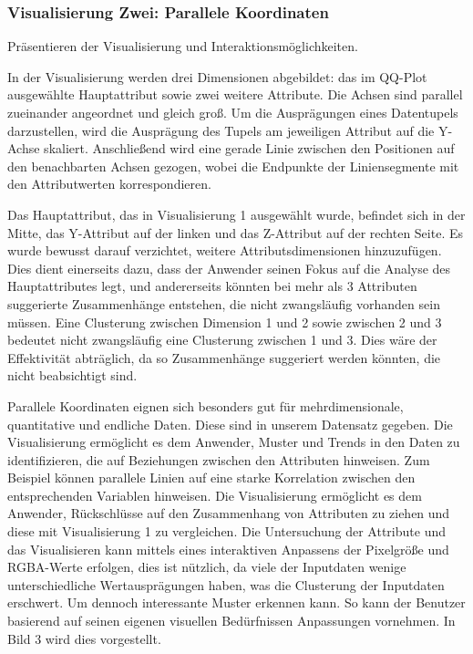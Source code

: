 \documentclass[usegeometry=true]{scrartcl}
\begin{document}
\subsubsection{Visualisierung Zwei: Parallele Koordinaten}
Präsentieren der Visualisierung und Interaktionsmöglichkeiten. 

In der Visualisierung werden drei Dimensionen abgebildet: das im QQ-Plot ausgewählte Hauptattribut sowie zwei weitere Attribute. Die Achsen sind parallel zueinander angeordnet und gleich groß. Um die Ausprägungen eines Datentupels darzustellen, wird die Ausprägung des Tupels am jeweiligen Attribut auf die Y-Achse skaliert. Anschließend wird eine gerade Linie zwischen den Positionen auf den benachbarten Achsen gezogen, wobei die Endpunkte der Liniensegmente mit den Attributwerten korrespondieren.

Das Hauptattribut, das in Visualisierung 1 ausgewählt wurde, befindet sich in der Mitte, das Y-Attribut auf der linken und das Z-Attribut auf der rechten Seite. Es wurde bewusst darauf verzichtet, weitere Attributsdimensionen hinzuzufügen. Dies dient einerseits dazu, dass der Anwender seinen Fokus auf die Analyse des Hauptattributes legt, und andererseits könnten bei mehr als 3 Attributen suggerierte Zusammenhänge entstehen, die nicht zwangsläufig vorhanden sein müssen. Eine Clusterung zwischen Dimension 1 und 2 sowie zwischen 2 und 3 bedeutet nicht zwangsläufig eine Clusterung zwischen 1 und 3. Dies wäre der Effektivität abträglich, da so Zusammenhänge suggeriert werden könnten, die nicht beabsichtigt sind.

Parallele Koordinaten eignen sich besonders gut für mehrdimensionale, quantitative und endliche Daten. Diese sind in unserem Datensatz gegeben. Die Visualisierung ermöglicht es dem Anwender, Muster und Trends in den Daten zu identifizieren, die auf Beziehungen zwischen den Attributen hinweisen. Zum Beispiel können parallele Linien auf eine starke Korrelation zwischen den entsprechenden Variablen hinweisen. Die Visualisierung ermöglicht es dem Anwender, Rückschlüsse auf den Zusammenhang von Attributen zu ziehen und diese mit Visualisierung 1 zu vergleichen. Die Untersuchung der Attribute und das Visualisieren kann mittels eines interaktiven Anpassens der Pixelgröße und RGBA-Werte erfolgen, dies ist nützlich, da viele der Inputdaten wenige unterschiedliche Wertausprägungen haben, was die Clusterung der Inputdaten erschwert. Um dennoch interessante Muster erkennen kann. So kann der Benutzer basierend auf seinen eigenen visuellen Bedürfnissen Anpassungen vornehmen. In Bild 3 wird dies vorgestellt.
\end{document}
